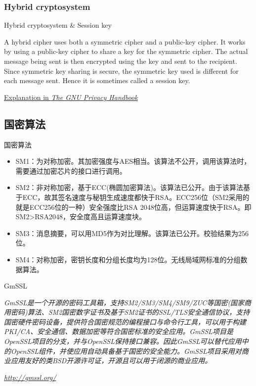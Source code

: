 \documentclass[UTF8]{ctexbeamer}
\begin{document}
\subsubsection{Hybrid cryptosystem}
\begin{frame}{Hybrid cryptosystem \& Session key}

    A hybrid cipher uses both a symmetric cipher and a public-key cipher. It works by using a public-key cipher to share a key for the symmetric cipher. The actual message being sent is then encrypted using the key and sent to the recipient. Since symmetric key sharing is secure, the symmetric key used is different for each message sent. Hence it is sometimes called a session key.
    
    \href{https://www.gnupg.org/gph/en/manual/x209.html}{Explanation in \textit{The GNU Privacy Handbook}}
\end{frame}

\subsection{国密算法}
\begin{frame}{国密算法}
    \begin{itemize}
        \item SM1：为对称加密。其加密强度与AES相当。该算法不公开，调用该算法时，需要通过加密芯片的接口进行调用。
        \item SM2：非对称加密，基于ECC(椭圆加密算法)。该算法已公开。由于该算法基于ECC，故其签名速度与秘钥生成速度都快于RSA。ECC256位（SM2采用的就是ECC256位的一种）安全强度比RSA 2048位高，但运算速度快于RSA。即SM2>RSA2048，安全度高且运算速度块。
        \item SM3：消息摘要，可以用MD5作为对比理解。该算法已公开。校验结果为256位。
        \item SM4：对称加密，密钥长度和分组长度均为128位。无线局域网标准的分组数据算法。
    \end{itemize}
\end{frame}

\begin{frame}{GmSSL}

    \textit{GmSSL是一个开源的密码工具箱，支持SM2/SM3/SM4/SM9/ZUC等国密(国家商用密码)算法、SM2国密数字证书及基于SM2证书的SSL/TLS安全通信协议，支持国密硬件密码设备，提供符合国密规范的编程接口与命令行工具，可以用于构建PKI/CA、安全通信、数据加密等符合国密标准的安全应用。GmSSL项目是OpenSSL项目的分支，并与OpenSSL保持接口兼容。因此GmSSL可以替代应用中的OpenSSL组件，并使应用自动具备基于国密的安全能力。GmSSL项目采用对商业应用友好的类BSD开源许可证，开源且可以用于闭源的商业应用。}
    
    \textit{\url{http://gmssl.org/}}
    
\end{frame}
\end{document}
